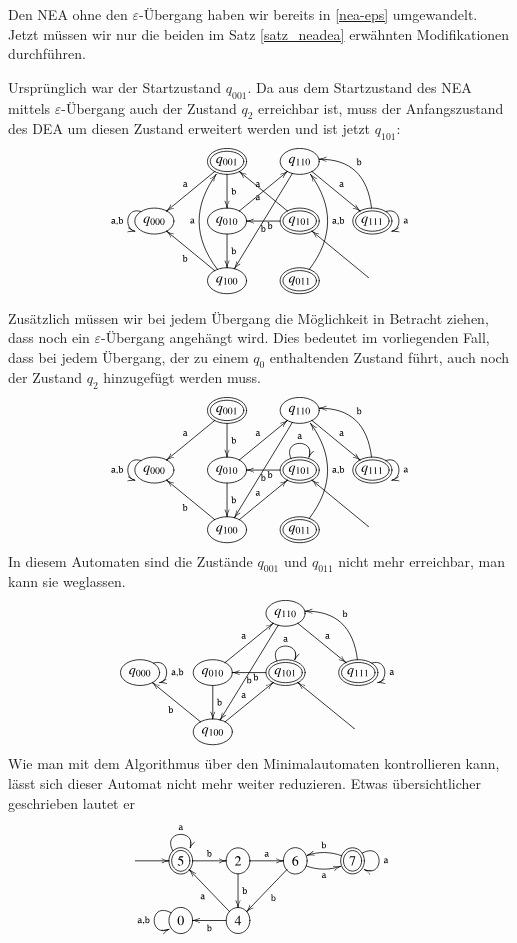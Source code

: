 Den NEA ohne den $\varepsilon$-Übergang haben wir bereits in
\ref{nea-eps} umgewandelt.
Jetzt müssen wir nur die beiden
im Satz \ref{satz_neadea} erwähnten Modifikationen durchführen.

Ursprünglich war der Startzustand $q_{001}$.
Da aus dem Startzustand
des NEA mittels $\varepsilon$-Übergang auch der Zustand $q_2$
erreichbar ist, muss der Anfangszustand des DEA um diesen Zustand
erweitert werden und ist jetzt $q_{101}$:
\[
\entrymodifiers={++[o][F]}
\xymatrix{
*+\txt{}
	&*++[o][F=]{q_{001}} \ar[d]^{\tt b}\ar[dl]_{\tt a}
		&{q_{110}}\ar[dr]^{\tt a} \ar[ddl]^{\tt b}
\\
{q_{000}}\ar@(ul,dl)_{{\tt a},{\tt b}}
	&{q_{010}} \ar[ur]^{\tt a} \ar[d]^{\tt b}
		&*++[o][F=]{q_{101}} \ar[ul]^{\tt a} \ar[l]^{\tt b}
			&*++[o][F=]{q_{111}}\ar@(ur,dr)^{{\tt a}} \ar@/_20pt/[ul]_{\tt b}
\\
*+\txt{}
	&{q_{100}}\ar@/^20pt/[uu]^{\tt a} \ar[ul]^{\tt b}
		&*++[o][F=]{q_{011}} \ar@/_20pt/[uu]_{{\tt a},{\tt b}}
			&*+\txt{}\ar[ul]
}
\]


Zusätzlich müssen wir bei jedem Übergang die Möglichkeit in
Betracht ziehen, dass noch ein $\varepsilon$-Übergang angehängt
wird.
Dies bedeutet im vorliegenden Fall, dass bei jedem Übergang,
der zu einem $q_0$ enthaltenden Zustand führt, auch noch der
Zustand $q_2$ hinzugefügt werden muss.
\[
\entrymodifiers={++[o][F]}
\xymatrix{
*+\txt{}
	&*++[o][F=]{q_{001}} \ar[d]^{\tt b}\ar[dl]_{\tt a}
		&{q_{110}}\ar[dr]^{\tt a} \ar[ddl]^{\tt b}
\\
{q_{000}}\ar@(ul,dl)_{{\tt a},{\tt b}}
	&{q_{010}} \ar[ur]^{\tt a} \ar[d]^{\tt b}
		&*++[o][F=]{q_{101}} \ar@(ul,ur)^{\tt a} \ar[l]^{\tt b}
			&*++[o][F=]{q_{111}}\ar@(ur,dr)^{{\tt a}} \ar@/_20pt/[ul]_{\tt b}
\\
*+\txt{}
	&{q_{100}}\ar[ur]^{\tt a} \ar[ul]^{\tt b}
		&*++[o][F=]{q_{011}} \ar@/_20pt/[uu]_{{\tt a},{\tt b}}
			&*+\txt{}\ar[ul]
}
\]
In diesem Automaten sind die Zustände $q_{001}$ und $q_{011}$ nicht
mehr erreichbar, man kann sie weglassen.
\[
\entrymodifiers={++[o][F]}
\xymatrix{
*+\txt{}
	&*+\txt{}
		&{q_{110}}\ar[dr]^{\tt a} \ar[ddl]^{\tt b}
\\
{q_{000}}\ar@(ur,dr)^{{\tt a},{\tt b}}
	&{q_{010}} \ar[ur]^{\tt a} \ar[d]^{\tt b}
		&*++[o][F=]{q_{101}} \ar@(ul,ur)^{\tt a} \ar[l]^{\tt b}
			&*++[o][F=]{q_{111}}\ar@(ur,dr)^{{\tt a}} \ar@/_20pt/[ul]_{\tt b}
\\
*+\txt{}
	&{q_{100}}\ar[ur]^{\tt a} \ar[ul]^{\tt b}
		&*+\txt{}
			&*+\txt{}\ar[ul]
}
\]
Wie man mit dem Algorithmus über den Minimalautomaten kontrollieren
kann, lässt sich dieser Automat nicht mehr weiter reduzieren.
Etwas übersichtlicher geschrieben lautet er
\[
\entrymodifiers={++[o][F]}
\xymatrix{
*+\txt{}\ar[r]
	&*++[o][F=]{5}\ar@(ul,ur)^{\tt a} \ar[r]^{\tt b}
		&2\ar[r]^{\tt a} \ar[d]^{\tt b}
			&6\ar@/_/[r]_{\tt a} \ar[dl]^{\tt b}
				&*++[o][F=]{7}\ar@/_/[l]_{\tt b} \ar@(ur,dr)^{\tt a}
\\
*+\txt{}
	&0\ar@(ul,dl)_{{\tt a},{\tt b}}
		&4\ar[ul]^{\tt a} \ar[l]^{\tt b}
}
\]


